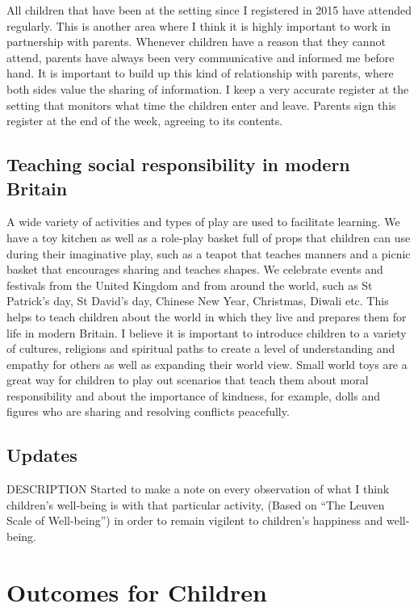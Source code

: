 \documentclass[10pt,a4paper]{report}
\makeatletter
\newcommand{\DESCRIPTION@original@item}{}
\let\DESCRIPTION@original@item\item
\newcommand*{\DESCRIPTION@envir}{DESCRIPTION}
\newlength{\DESCRIPTION@totalleftmargin}
\newlength{\DESCRIPTION@linewidth}
\newcommand{\DESCRIPTION@makelabel}[1]{\llap{#1}}%
\newcommand{\DESCRIPTION@item}[1][]{%
  \setlength{\@totalleftmargin}%
       {\DESCRIPTION@totalleftmargin+\widthof{\textbf{#1 }}-\leftmargin}%
  \setlength{\linewidth}
       {\DESCRIPTION@linewidth-\widthof{\textbf{#1 }}+\leftmargin}%
  \par\parshape \@ne \@totalleftmargin \linewidth
  \DESCRIPTION@original@item[\textbf{#1}]%
}
\newenvironment{DESCRIPTION}
  {\list{}{\setlength{\labelwidth}{0cm}%
           \let\makelabel\DESCRIPTION@makelabel}%
   \setlength{\DESCRIPTION@totalleftmargin}{\@totalleftmargin}%
   \setlength{\DESCRIPTION@linewidth}{\linewidth}%
   \renewcommand{\item}{\ifx\@currenvir\DESCRIPTION@envir
                           \expandafter\DESCRIPTION@item
                        \else
                           \expandafter\DESCRIPTION@original@item
                        \fi}}
  {\endlist}
\makeatother
\begin{document}
\begin{DESCRIPTION}
All children that have been at the setting since I registered in 2015 have attended regularly. This is another area where I think it is highly important to work in partnership with parents. Whenever children have a reason that they cannot attend, parents have always been very communicative and informed me before hand. It is important to build up this kind of relationship with parents, where both sides value the sharing of information. I keep a very accurate register at the setting that monitors what time the children enter and leave. Parents sign this register at the end of the week, agreeing to its contents.

\section{Teaching social responsibility in modern Britain}

A wide variety of activities and types of play are used to facilitate learning. We have a toy kitchen as well as a role-play basket full of props that children can use during their imaginative play, such as a teapot that teaches manners and a picnic basket that encourages sharing and teaches shapes. We celebrate events and festivals from the United Kingdom and from around the world, such as St Patrick's day, St David's day, Chinese New Year, Christmas, Diwali etc. This helps to teach children about the world in which they live and prepares them for life in modern Britain. I believe it is important to introduce children to a variety of cultures, religions and spiritual paths to create a level of understanding and empathy for others as well as expanding their world view. Small world toys are a great way for children to play out scenarios that teach them about moral responsibility and about the importance of kindness, for example, dolls and figures who are sharing and resolving conflicts peacefully.

\section{Updates}

\begin{DESCRIPTION}
\item [June 2016] Started to make a note on every observation of what I think children's well-being is with that particular activity, (Based on “The Leuven Scale of Well-being”) in order to remain vigilent to children's happiness and well-being.

\chapter{Outcomes for Children}


\end{DESCRIPTION}
\end{DESCRIPTION}
\end{document}
